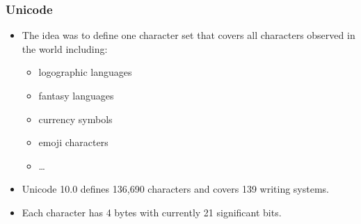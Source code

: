             \subsubsection{Unicode} %
                \begin{itemize}
                	\item The idea was to define one character set that covers all characters observed in the world including:
                		\begin{itemize}
                			\item logographic languages
                			\item fantasy languages
                			\item currency symbols
                			\item emoji characters
                			\item \dots
                		\end{itemize}
                	\item Unicode 10.0 defines 136,690 characters and covers 139 writing systems.
                	\item Each character has 4 bytes with currently 21 significant bits.
                \end{itemize}
            
